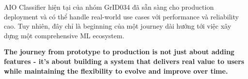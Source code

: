 AIO Classifier hiện tại của nhóm GrID034 đã sẵn sàng cho production deployment và có thể handle real-world use cases với performance và reliability cao. Tuy nhiên, đây chỉ là beginning của một journey dài hướng tới việc xây dựng một comprehensive ML ecosystem.

\textbf{The journey from prototype to production is not just about adding features - it's about building a system that delivers real value to users while maintaining the flexibility to evolve and improve over time.}
